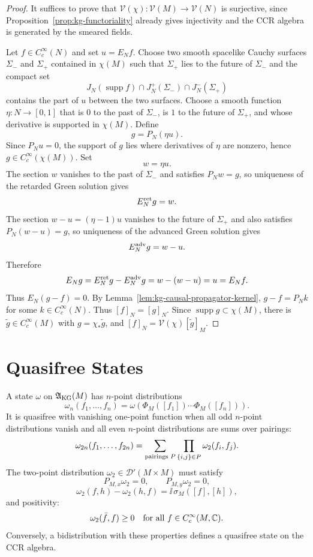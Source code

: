 \begin{proof}
It suffices to prove that
\(\mathcal V(\chi):\mathcal V(M)\to\mathcal V(N)\) is surjective, since
Proposition~\ref{prop:kg-functoriality} already gives injectivity and the
CCR algebra is generated by the smeared fields.

Let \(f\in C_c^\infty(N)\) and set \(u=E_Nf\).  Choose two smooth spacelike
Cauchy surfaces \(\Sigma_-\) and \(\Sigma_+\) contained in \(\chi(M)\) such
that \(\Sigma_+\) lies to the future of \(\Sigma_-\) and the compact set
\[
  J_N(\operatorname{supp}f)\cap J_N^+(\Sigma_-)\cap J_N^-(\Sigma_+)
\]
contains the part of \(u\) between the two surfaces.  Choose a smooth
function \(\eta:N\to[0,1]\) that is \(0\) to the past of \(\Sigma_-\), is
\(1\) to the future of \(\Sigma_+\), and whose derivative is supported in
\(\chi(M)\).  Define
\[
  g=P_N(\eta u).
\]
Since \(P_Nu=0\), the support of \(g\) lies where derivatives of \(\eta\)
are nonzero, hence \(g\in C_c^\infty(\chi(M))\).  Set
\[
  w=\eta u .
\]
The section \(w\) vanishes to the past of \(\Sigma_-\) and satisfies
\(P_Nw=g\), so uniqueness of the retarded Green solution gives
\[
  E_N^{\rm ret}g=w .
\]
The section \(w-u=(\eta-1)u\) vanishes to the future of \(\Sigma_+\) and
also satisfies \(P_N(w-u)=g\), so uniqueness of the advanced Green solution
gives
\[
  E_N^{\rm adv}g=w-u .
\]
Therefore
\[
  E_Ng=E_N^{\rm ret}g-E_N^{\rm adv}g=w-(w-u)=u=E_Nf .
\]
Thus \(E_N(g-f)=0\).
By Lemma~\ref{lem:kg-causal-propagator-kernel}, \(g-f=P_Nk\) for some
\(k\in C_c^\infty(N)\).  Thus \([f]_N=[g]_N\).  Since
\(\operatorname{supp}g\subset\chi(M)\), there is
\(\widetilde g\in C_c^\infty(M)\) with \(g=\chi_*\widetilde g\), and
\([f]_N=\mathcal V(\chi)[\widetilde g]_M\).
\end{proof}

\section{Quasifree States}

A state \(\omega\) on \(\mathfrak A_{\rm KG}(M)\) has \(n\)-point
distributions
\[
  \omega_n(f_1,\ldots,f_n)
  =
  \omega\!\left(\Phi_M([f_1])\cdots\Phi_M([f_n])\right).
\]
It is quasifree with vanishing one-point function when all odd \(n\)-point
distributions vanish and all even \(n\)-point distributions are sums over
pairings:
\[
  \omega_{2n}(f_1,\ldots,f_{2n})
  =
  \sum_{\hbox{\scriptsize pairings }P}
  \prod_{\{i,j\}\in P}\omega_2(f_i,f_j).
\]
The two-point distribution \(\omega_2\in\mathcal D'(M\times M)\) must
satisfy
\[
  P_{M,x}\omega_2=0,\qquad P_{M,y}\omega_2=0,
\]
\[
  \omega_2(f,h)-\omega_2(h,f)=\ii\,\sigma_M([f],[h]),
\]
and positivity:
\[
  \omega_2(\bar f,f)\ge0
  \quad\hbox{for all }f\in C_c^\infty(M,\mathbb C).
\]
Conversely, a bidistribution with these properties defines a quasifree state
on the CCR algebra.

